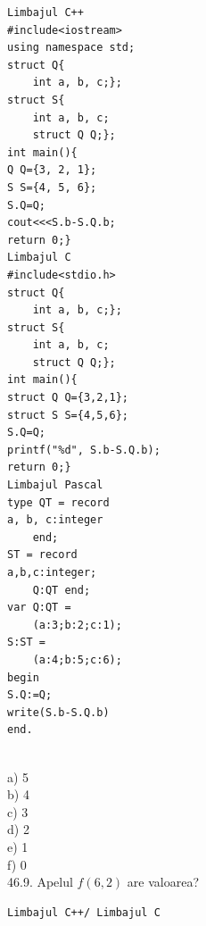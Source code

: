 \begin{itemize}
\begin{enumerate}
\begin{verbatim}
Limbajul C++
#include<iostream>
using namespace std;
struct Q{
    int a, b, c;};
struct S{
    int a, b, c;
    struct Q Q;};
int main(){
Q Q={3, 2, 1};
S S={4, 5, 6};
S.Q=Q;
cout<<<S.b-S.Q.b;
return 0;}
Limbajul C
#include<stdio.h> 
struct Q{
    int a, b, c;};
struct S{
    int a, b, c;
    struct Q Q;};
int main(){
struct Q Q={3,2,1};
struct S S={4,5,6};
S.Q=Q;
printf("%d", S.b-S.Q.b);
return 0;}
Limbajul Pascal
type QT = record
a, b, c:integer
    end;
ST = record
a,b,c:integer;
    Q:QT end;
var Q:QT =
    (a:3;b:2;c:1);
S:ST =
    (a:4;b:5;c:6);
begin
S.Q:=Q;
write(S.b-S.Q.b)
end.
\end{verbatim}
\\
a) 5
\\
b) 4
\\
c) 3
\\
d) 2
\\
e) 1
\\
f) 0
\\
46.9. Apelul $f(6,2)$ are valoarea?
\begin{verbatim}
Limbajul C++/ Limbajul C


\end{verbatim}
\end{enumerate}
\end{itemize}
